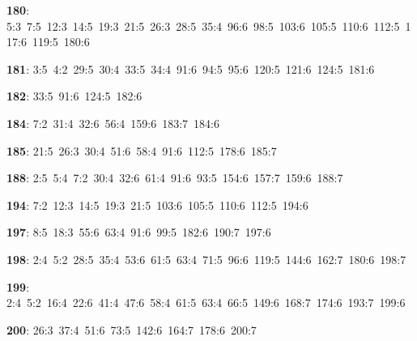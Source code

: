 \noindent \textbf{180}: 5:3\allowbreak\ 7:5\allowbreak\ 12:3\allowbreak\ 14:5\allowbreak\ 19:3\allowbreak\ 21:5\allowbreak\ 26:3\allowbreak\ 28:5\allowbreak\ 35:4\allowbreak\ 96:6\allowbreak\ 98:5\allowbreak\ 103:6\allowbreak\ 105:5\allowbreak\ 110:6\allowbreak\ 112:5\allowbreak\ 117:6\allowbreak\ 119:5\allowbreak\ 180:6\par
\noindent \textbf{181}: 3:5\allowbreak\ 4:2\allowbreak\ 29:5\allowbreak\ 30:4\allowbreak\ 33:5\allowbreak\ 34:4\allowbreak\ 91:6\allowbreak\ 94:5\allowbreak\ 95:6\allowbreak\ 120:5\allowbreak\ 121:6\allowbreak\ 124:5\allowbreak\ 181:6\par
\noindent \textbf{182}: 33:5\allowbreak\ 91:6\allowbreak\ 124:5\allowbreak\ 182:6\par
\noindent \textbf{184}: 7:2\allowbreak\ 31:4\allowbreak\ 32:6\allowbreak\ 56:4\allowbreak\ 159:6\allowbreak\ 183:7\allowbreak\ 184:6\par
\noindent \textbf{185}: 21:5\allowbreak\ 26:3\allowbreak\ 30:4\allowbreak\ 51:6\allowbreak\ 58:4\allowbreak\ 91:6\allowbreak\ 112:5\allowbreak\ 178:6\allowbreak\ 185:7\par
\noindent \textbf{188}: 2:5\allowbreak\ 5:4\allowbreak\ 7:2\allowbreak\ 30:4\allowbreak\ 32:6\allowbreak\ 61:4\allowbreak\ 91:6\allowbreak\ 93:5\allowbreak\ 154:6\allowbreak\ 157:7\allowbreak\ 159:6\allowbreak\ 188:7\par
\noindent \textbf{194}: 7:2\allowbreak\ 12:3\allowbreak\ 14:5\allowbreak\ 19:3\allowbreak\ 21:5\allowbreak\ 103:6\allowbreak\ 105:5\allowbreak\ 110:6\allowbreak\ 112:5\allowbreak\ 194:6\par
\noindent \textbf{197}: 8:5\allowbreak\ 18:3\allowbreak\ 55:6\allowbreak\ 63:4\allowbreak\ 91:6\allowbreak\ 99:5\allowbreak\ 182:6\allowbreak\ 190:7\allowbreak\ 197:6\par
\noindent \textbf{198}: 2:4\allowbreak\ 5:2\allowbreak\ 28:5\allowbreak\ 35:4\allowbreak\ 53:6\allowbreak\ 61:5\allowbreak\ 63:4\allowbreak\ 71:5\allowbreak\ 96:6\allowbreak\ 119:5\allowbreak\ 144:6\allowbreak\ 162:7\allowbreak\ 180:6\allowbreak\ 198:7\par
\noindent \textbf{199}: 2:4\allowbreak\ 5:2\allowbreak\ 16:4\allowbreak\ 22:6\allowbreak\ 41:4\allowbreak\ 47:6\allowbreak\ 58:4\allowbreak\ 61:5\allowbreak\ 63:4\allowbreak\ 66:5\allowbreak\ 149:6\allowbreak\ 168:7\allowbreak\ 174:6\allowbreak\ 193:7\allowbreak\ 199:6\par
\noindent \textbf{200}: 26:3\allowbreak\ 37:4\allowbreak\ 51:6\allowbreak\ 73:5\allowbreak\ 142:6\allowbreak\ 164:7\allowbreak\ 178:6\allowbreak\ 200:7\par
